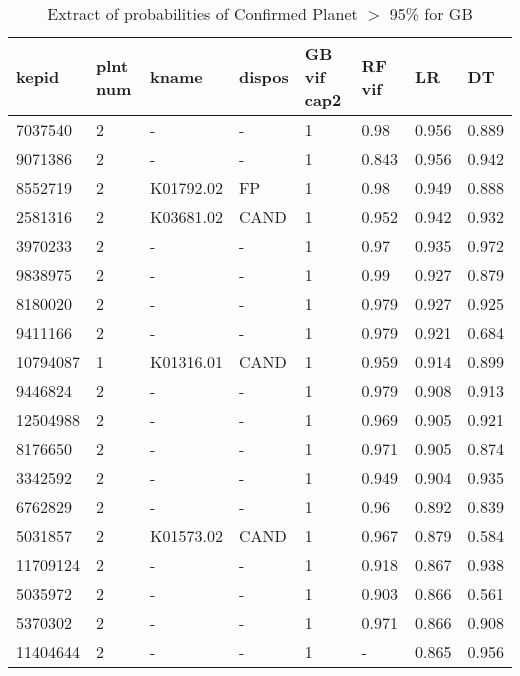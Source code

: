 \begin{table}[!htbp]
 \centering
 \caption{Extract of probabilities of Confirmed Planet $>$ 95\% for GB}
 \label{dataGBvifcap2RFvifLRDTcrefbtab} 
  \begin{tabular}
{| 
 p{}| 
 p{}| 
 p{}| 
 p{}| 
 p{}| 
 p{}| 
 p{}| 
 p{}| 
}\hline 
\textbf{kepid} &\textbf{plnt num} &\textbf{kname} &\textbf{dispos} &\textbf{GB vif cap2} &\textbf{RF vif} &\textbf{LR} &\textbf{DT} \\ \hline 
7037540 &2 &- &- &1 &0.98 &0.956 &0.889 \\ \hline 
9071386 &2 &- &- &1 &0.843 &0.956 &0.942 \\ \hline 
8552719 &2 &K01792.02 &FP &1 &0.98 &0.949 &0.888 \\ \hline 
2581316 &2 &K03681.02 &CAND &1 &0.952 &0.942 &0.932 \\ \hline 
3970233 &2 &- &- &1 &0.97 &0.935 &0.972 \\ \hline 
9838975 &2 &- &- &1 &0.99 &0.927 &0.879 \\ \hline 
8180020 &2 &- &- &1 &0.979 &0.927 &0.925 \\ \hline 
9411166 &2 &- &- &1 &0.979 &0.921 &0.684 \\ \hline 
10794087 &1 &K01316.01 &CAND &1 &0.959 &0.914 &0.899 \\ \hline 
9446824 &2 &- &- &1 &0.979 &0.908 &0.913 \\ \hline 
12504988 &2 &- &- &1 &0.969 &0.905 &0.921 \\ \hline 
8176650 &2 &- &- &1 &0.971 &0.905 &0.874 \\ \hline 
3342592 &2 &- &- &1 &0.949 &0.904 &0.935 \\ \hline 
6762829 &2 &- &- &1 &0.96 &0.892 &0.839 \\ \hline 
5031857 &2 &K01573.02 &CAND &1 &0.967 &0.879 &0.584 \\ \hline 
11709124 &2 &- &- &1 &0.918 &0.867 &0.938 \\ \hline 
5035972 &2 &- &- &1 &0.903 &0.866 &0.561 \\ \hline 
5370302 &2 &- &- &1 &0.971 &0.866 &0.908 \\ \hline 
11404644 &2 &- &- &1 &- &0.865 &0.956 \\ \hline 
\end{tabular} 
\end{table}